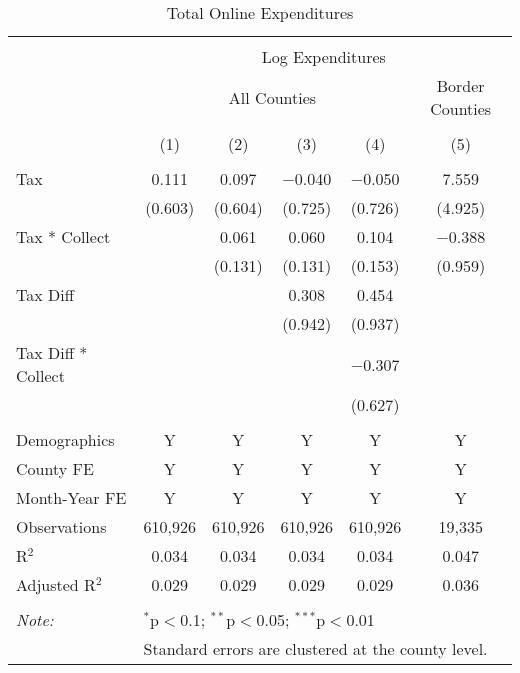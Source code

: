 
\begin{table}[!htbp] \centering 
  \caption{Total Online Expenditures} 
  \label{} 
\begin{tabular}{@{\extracolsep{5pt}}lccccc} 
\\[-1.8ex]\hline 
\hline \\[-1.8ex] 
 & \multicolumn{5}{c}{Log Expenditures} \\ 
\cline{2-6} 
 & \multicolumn{4}{c}{All Counties} & Border Counties \\ 
\\[-1.8ex] & (1) & (2) & (3) & (4) & (5)\\ 
\hline \\[-1.8ex] 
 Tax & 0.111 & 0.097 & $-$0.040 & $-$0.050 & 7.559 \\ 
  & (0.603) & (0.604) & (0.725) & (0.726) & (4.925) \\ 
  Tax * Collect &  & 0.061 & 0.060 & 0.104 & $-$0.388 \\ 
  &  & (0.131) & (0.131) & (0.153) & (0.959) \\ 
  Tax Diff &  &  & 0.308 & 0.454 &  \\ 
  &  &  & (0.942) & (0.937) &  \\ 
  Tax Diff * Collect &  &  &  & $-$0.307 &  \\ 
  &  &  &  & (0.627) &  \\ 
 \hline \\[-1.8ex] 
Demographics & Y & Y & Y & Y & Y \\ 
County FE & Y & Y & Y & Y & Y \\ 
Month-Year FE & Y & Y & Y & Y & Y \\ 
Observations & 610,926 & 610,926 & 610,926 & 610,926 & 19,335 \\ 
R$^{2}$ & 0.034 & 0.034 & 0.034 & 0.034 & 0.047 \\ 
Adjusted R$^{2}$ & 0.029 & 0.029 & 0.029 & 0.029 & 0.036 \\ 
\hline 
\hline \\[-1.8ex] 
\textit{Note:}  & \multicolumn{5}{l}{$^{*}$p$<$0.1; $^{**}$p$<$0.05; $^{***}$p$<$0.01} \\ 
 & \multicolumn{5}{l}{Standard errors are clustered at the county level.} \\ 
\end{tabular} 
\end{table} 
